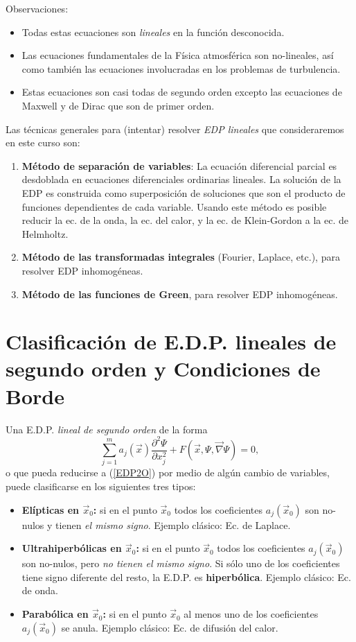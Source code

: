 Observaciones:

\begin{itemize}
\item Todas estas ecuaciones son \textit{lineales} en la función desconocida.
\item Las ecuaciones fundamentales de la Física atmosférica son no-lineales, así como también las ecuaciones involucradas en los problemas de turbulencia.
\item Estas ecuaciones son casi todas de segundo orden excepto las ecuaciones de Maxwell y de Dirac que son de primer orden.
\end{itemize}

Las técnicas generales para (intentar) resolver \textit{EDP lineales} que consideraremos en este curso son:
\begin{enumerate}
\item \textbf{Método de separación de variables}: La ecuación diferencial parcial es desdoblada en ecuaciones diferenciales ordinarias lineales. La solución de la EDP es construida como superposición de soluciones que son el producto de funciones dependientes de cada variable. Usando este método es posible reducir la ec. de la onda, la ec. del calor, y la ec. de Klein-Gordon a la ec. de Helmholtz.
\item \textbf{Método de las transformadas integrales} (Fourier, Laplace, etc.), para resolver EDP inhomogéneas.
\item \textbf{Método de las funciones de Green}, para resolver EDP inhomogéneas.

\end{enumerate}

\section{Clasificación de E.D.P. lineales de segundo orden y Condiciones de Borde}

Una E.D.P. \textit{lineal de segundo orden} de la forma \cite{Hassani}
\begin{equation}\label{EDP2O}
\sum_{j=1}^m a_j(\vec{x})\frac{\partial^2\Psi}{\partial x_j^2}+F\left(\vec{x},\Psi,\vec\nabla\Psi\right)=0,
\end{equation}
o que pueda reducirse a (\ref{EDP2O}) por medio de algún cambio de variables, puede clasificarse en los siguientes tres tipos:
\begin{itemize}
\item \textbf{Elípticas en $\vec{x}_0$:} si en el punto $\vec{x}_0$ todos los coeficientes $a_j(\vec{x}_0)$ son no-nulos y tienen \textit{el mismo signo}. Ejemplo clásico: Ec. de Laplace.
\item \textbf{Ultrahiperbólicas en $\vec{x}_0$:} si en el punto $\vec{x}_0$ todos los coeficientes $a_j(\vec{x}_0)$ son no-nulos, pero \textit{no tienen el mismo signo}. Si sólo uno de los coeficientes tiene signo diferente del resto, la E.D.P. es \textbf{hiperbólica}. Ejemplo clásico: Ec. de onda.
\item \textbf{Parabólica en $\vec{x}_0$:} si en el punto $\vec{x}_0$ al menos uno de los coeficientes $a_j(\vec{x}_0)$ se anula. Ejemplo clásico: Ec. de difusión del calor.
\end{itemize}

